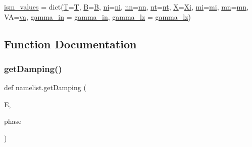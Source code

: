 \begin{DoxyCompactItemize}
\hyperlink{namespacenamelist_a04b110407bf407ce52822ef352a6f01e}{ism\+\_\+values} = dict(\hyperlink{namespacenamelist_acc085fb18af4161be26b359a7e389498}{T}=\hyperlink{namespacenamelist_acc085fb18af4161be26b359a7e389498}{T}, \hyperlink{namespacenamelist_a48ab86f6cb5d4c6de82427283c61ed93}{B}=\hyperlink{namespacenamelist_a48ab86f6cb5d4c6de82427283c61ed93}{B}, \hyperlink{namespacenamelist_a6628cb083819caf50214d44e23ad964c}{ni}=\hyperlink{namespacenamelist_a6628cb083819caf50214d44e23ad964c}{ni}, \hyperlink{namespacenamelist_a4294f2624df5d3000084ae4161a8724f}{nn}=\hyperlink{namespacenamelist_a4294f2624df5d3000084ae4161a8724f}{nn}, \hyperlink{namespacenamelist_afa8313c950e0dfdd49787f0fe279e6da}{nt}=\hyperlink{namespacenamelist_afa8313c950e0dfdd49787f0fe279e6da}{nt}, \hyperlink{namespacenamelist_af0c918988527847f8c4d92e5dd09cde0}{X}=\hyperlink{namespacenamelist_a3cf16c58d15de0a13f6ef0e3e40980a1}{Xi}, \hyperlink{namespacenamelist_a9e965a35b0fa0cff87b107001d5c7701}{mi}=\hyperlink{namespacenamelist_a9e965a35b0fa0cff87b107001d5c7701}{mi}, \hyperlink{namespacenamelist_ae4897dd96ab17fb714286ebea56954a4}{mn}=\hyperlink{namespacenamelist_ae4897dd96ab17fb714286ebea56954a4}{mn}, VA=\hyperlink{namespacenamelist_a846209f02cb16bb8cd9701290aeb9829}{va}, \hyperlink{namespacenamelist_a698275988d17c90a7d6c00f8143021cf}{gamma\+\_\+in} = \hyperlink{namespacenamelist_a698275988d17c90a7d6c00f8143021cf}{gamma\+\_\+in}, \hyperlink{namespacenamelist_a44bbefa452cfa3aa7ee4578357244e9c}{gamma\+\_\+lz} = \hyperlink{namespacenamelist_a44bbefa452cfa3aa7ee4578357244e9c}{gamma\+\_\+lz})
\end{DoxyCompactItemize}


\subsection{Function Documentation}
\mbox{\label{namespacenamelist_a84b4e870f028d6260f181fc10be58da6}} 
\subsubsection{\texorpdfstring{get\+Damping()}{getDamping()}}
{\footnotesize\ttfamily def namelist.\+get\+Damping (\begin{DoxyParamCaption}\item[{}]{E,  }\item[{}]{phase }\end{DoxyParamCaption})}

